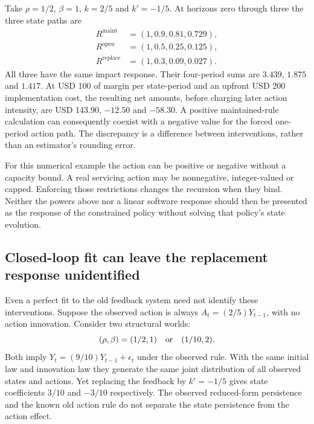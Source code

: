 Take $\rho=1/2$, $\beta=1$, $k=2/5$ and $k'=-1/5$. At horizons
zero through three the three state paths are
\begin{align}
 R^{\mathrm{maint}}&=(1,0.9,0.81,0.729),\nonumber\\
 R^{\mathrm{open}}&=(1,0.5,0.25,0.125),\nonumber\\
 R^{\mathrm{replace}}&=(1,0.3,0.09,0.027).
 \label{exec17:s6-feedback-paths}
\end{align}
All three have the same impact response. Their four-period sums are
$3.439$, $1.875$ and $1.417$. At USD 100 of margin per state-period
and an upfront USD 200 implementation cost, the resulting net amounts,
before charging later action intensity, are USD 143.90, $-12.50$ and
$-58.30$. A positive maintained-rule calculation can consequently coexist
with a negative value for the forced one-period action path. The discrepancy
is a difference between interventions, rather than an estimator's rounding
error.~\citep{exec17_s6_math}

For this numerical example the action can be positive or negative without a
capacity bound. A real servicing action may be nonnegative, integer-valued or
capped. Enforcing those restrictions changes the recursion when they bind.
Neither the powers above nor a linear software response should then be
presented as the response of the constrained policy without solving that
policy's state evolution.

\subsection{Closed-loop fit can leave the replacement response unidentified}

Even a perfect fit to the old feedback system need not identify these
interventions. Suppose the observed action is always $A_t=(2/5)Y_{t-1}$,
with no action innovation. Consider two structural worlds:
\begin{equation}
 (\rho,\beta)=(1/2,1)\quad\hbox{or}\quad(1/10,2).
 \label{exec17:s6-two-worlds}
\end{equation}
Both imply $Y_t=(9/10)Y_{t-1}+\epsilon_t$ under the observed rule.
With the same initial law and innovation law they generate the same joint
distribution of all observed states and actions. Yet replacing the feedback
by $k'=-1/5$ gives state coefficients $3/10$ and $-3/10$ respectively.
The observed reduced-form persistence and the known old action rule do not
separate the state persistence from the action effect.

